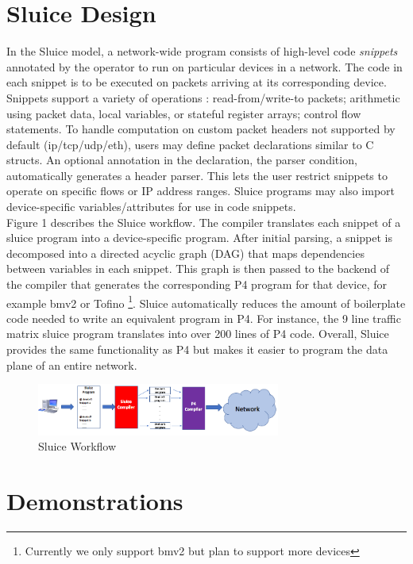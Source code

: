 \section{Sluice Design}
In the Sluice model, a network-wide program consists of high-level code \textit{snippets} annotated by the operator to run on particular devices in a network. The code in each snippet is to be executed on packets arriving at its corresponding device. Snippets support a variety of operations : read-from/write-to packets; arithmetic using packet data, local variables, or stateful register arrays; control flow statements. To handle computation on custom packet headers not supported by default (ip/tcp/udp/eth), users may define packet declarations similar to C structs. An optional annotation in the declaration, the parser condition, automatically generates a header parser. This lets the user restrict snippets to operate on specific flows or IP address ranges. Sluice programs may also import device-specific variables/attributes for use in code snippets. \\
\indent Figure 1 describes the Sluice workflow. The compiler translates each snippet of a sluice program into a device-specific program. After initial parsing, a snippet is decomposed into a directed acyclic graph (DAG) that maps dependencies between variables in each snippet. This graph is then passed to the backend of the compiler that generates the corresponding P4 program for that device, for example bmv2 or Tofino \footnote{Currently we only support bmv2 but plan to support more devices}. Sluice automatically reduces the amount of boilerplate code needed to write an equivalent program in P4. For instance, the 9 line traffic matrix sluice program translates into over 200 lines of P4 code. Overall, Sluice provides the same functionality as P4 but makes it easier to program the data plane of an entire network. 

\begin{figure}[tp]
\centering
\includegraphics[width=80mm,scale=0.7]{figures/sluice_workflow.png}
\caption{Sluice Workflow}
\end{figure}


 


\section{Demonstrations}
 
